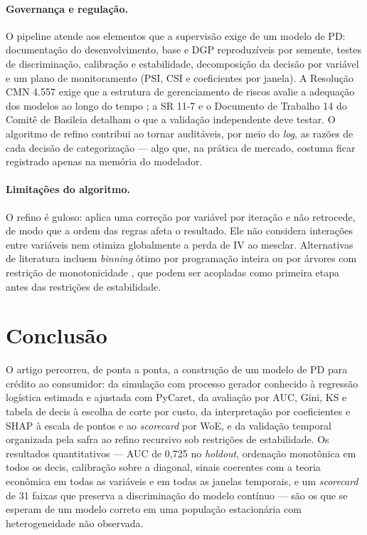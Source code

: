 \documentclass[11pt,a4paper]{article}
\begin{document}
\paragraph{Governança e regulação.} O pipeline atende aos elementos que a supervisão exige de um modelo de PD: documentação do desenvolvimento, base e DGP reproduzíveis por semente, testes de discriminação, calibração e estabilidade, decomposição da decisão por variável e um plano de monitoramento (PSI, CSI e coeficientes por janela). A Resolução CMN 4.557 exige que a estrutura de gerenciamento de riscos avalie a adequação dos modelos ao longo do tempo \citep{cmn4557}; a SR 11-7 \citep{sr117} e o Documento de Trabalho 14 do Comitê de Basileia \citep{bcbs2005} detalham o que a validação independente deve testar. O algoritmo de refino contribui ao tornar auditáveis, por meio do \emph{log}, as razões de cada decisão de categorização --- algo que, na prática de mercado, costuma ficar registrado apenas na memória do modelador.

\paragraph{Limitações do algoritmo.} O refino é guloso: aplica uma correção por variável por iteração e não retrocede, de modo que a ordem das regras afeta o resultado. Ele não considera interações entre variáveis nem otimiza globalmente a perda de IV ao mesclar. Alternativas de literatura incluem \emph{binning} ótimo por programação inteira ou por árvores com restrição de monotonicidade \citep{zeng2014}, que podem ser acopladas como primeira etapa antes das restrições de estabilidade.

\section{Conclusão}
\label{sec:conclusao}

O artigo percorreu, de ponta a ponta, a construção de um modelo de PD para crédito ao consumidor: da simulação com processo gerador conhecido à regressão logística estimada e ajustada com PyCaret, da avaliação por AUC, Gini, KS e tabela de decis à escolha de corte por custo, da interpretação por coeficientes e SHAP à escala de pontos e ao \emph{scorecard} por WoE, e da validação temporal organizada pela safra ao refino recursivo sob restrições de estabilidade. Os resultados quantitativos --- AUC de 0{,}725 no \emph{holdout}, ordenação monotônica em todos os decis, calibração sobre a diagonal, sinais coerentes com a teoria econômica em todas as variáveis e em todas as janelas temporais, e um \emph{scorecard} de 31 faixas que preserva a discriminação do modelo contínuo --- são os que se esperam de um modelo correto em uma população estacionária com heterogeneidade não observada.
\end{document}
